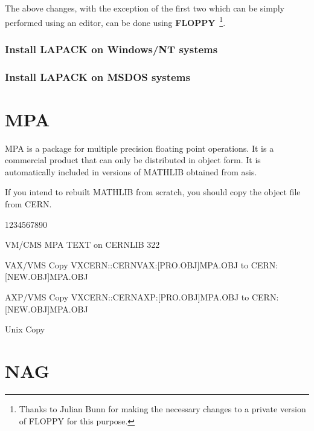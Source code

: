 The above changes, with the exception of the first two
which can be simply performed using an editor, can
be done using {\bf FLOPPY}~\footnote{Thanks to Julian Bunn
for making the necessary changes to a private version of
FLOPPY for this purpose.}.


\subsubsection{Install LAPACK on Windows/NT systems}
\subsubsection{Install LAPACK on MSDOS systems}

\section{MPA}

\label{sect-MPA}


MPA is a package for multiple precision floating point
operations. It is a commercial product that can only
be distributed in object form. It is automatically included
in versions of MATHLIB obtained from asis.

If you intend to rebuilt MATHLIB from scratch, you should
copy the object file from CERN.

\begin{DLtt}{1234567890}
\item[VM/CMS]MPA TEXT on CERNLIB 322
\item[VAX/VMS]Copy VXCERN::CERNVAX:[PRO.OBJ]MPA.OBJ to CERN:[NEW.OBJ]MPA.OBJ
\item[AXP/VMS]Copy VXCERN::CERNAXP:[PRO.OBJ]MPA.OBJ to CERN:[NEW.OBJ]MPA.OBJ
\item[Unix]Copy 
\end{DLtt}

\section{NAG}

